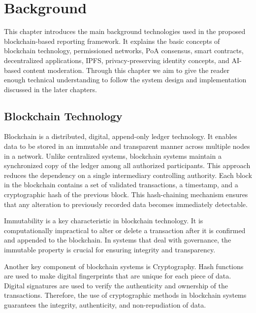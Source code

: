 \chapter{Background}

This chapter introduces the main background technologies used in the proposed blockchain-based reporting framework. It explains the basic concepts of blockchain technology, permissioned networks, PoA consensus, smart contracts, decentralized applications, \ac{IPFS}, privacy-preserving identity concepts, and AI-based content moderation. Through this chapter we aim to give the reader enough technical understanding to follow the system design and implementation discussed in the later chapters.

\section{Blockchain Technology}

Blockchain is a distributed, digital, append-only ledger technology. It enables data to be stored in an immutable and transparent manner across multiple nodes in a network. Unlike centralized systems, blockchain systems maintain a synchronized copy of the ledger among all authorized participants. This approach reduces the dependency on a single intermediary controlling authority. Each block in the blockchain contains a set of validated transactions, a timestamp, and a cryptographic hash of the previous block. This hash-chaining mechanism ensures that any alteration to previously recorded data becomes immediately detectable. 

Immutability is a key characteristic in blockchain technology. It is computationally impractical to alter or delete a transaction after it is confirmed and appended to the blockchain. In systems that deal with governance, the immutable property is crucial for ensuring integrity and transparency. 

Another key component of blockchain systems is Cryptography. Hash functions are used to make digital fingerprints that are unique for each piece of data. Digital signatures are used to verify the authenticity and ownership of the transactions. Therefore, the use of cryptographic methods in blockchain systems guarantees the integrity, authenticity, and non-repudiation of data.


